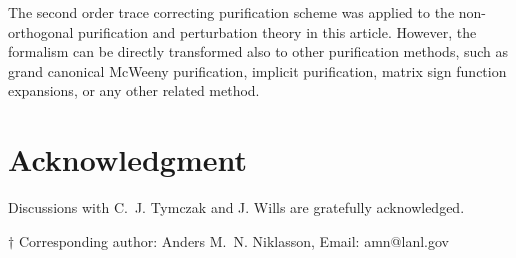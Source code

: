 \documentclass[twocolumn,showpacs,preprintnumbers,amsmath,amssymb]{revtex4}
\begin{document}
The second order trace correcting purification scheme was applied to the
non-orthogonal purification and perturbation theory in this article. However, the formalism
can be directly transformed also to other purification methods, such as grand canonical McWeeny 
purification, implicit purification, matrix sign function expansions, or any other related method. 


\section{Acknowledgment}

Discussions with C.\ J. Tymczak and J. Wills are gratefully acknowledged.



{${\dagger}$ Corresponding author: Anders M.\ N. Niklasson, Email: amn@lanl.gov}
\end{document}
